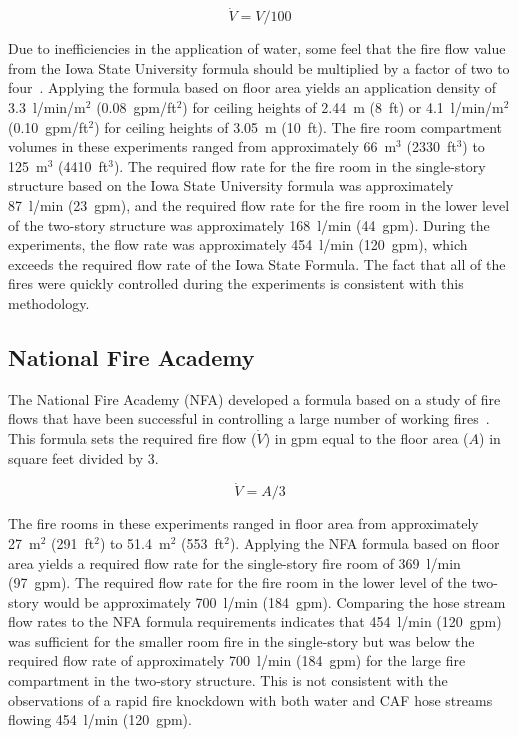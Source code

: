 \documentclass[12pt,oneside]{book}
\begin{document}
\begin{equation}\label{eq:isu_form}
\dot{V} = V / 100
\end{equation}

Due to inefficiencies in the application of water, some feel that the fire flow value from the Iowa State University formula should be multiplied by a factor of two to four~\cite{NFPA}. Applying the formula based on floor area yields an application density of 3.3~l/min/m$^2$ (0.08~gpm/ft$^2$) for ceiling heights of 2.44~m (8~ft) or 4.1~l/min/m$^2$ (0.10~gpm/ft$^2$) for ceiling heights of 3.05~m (10~ft). The fire room compartment volumes in these experiments ranged from approximately 66~m$^3$ (2330~ft$^3$) to 125~m$^3$ (4410~ft$^3$). The required flow rate for the fire room in the single-story structure based on the Iowa State University formula was approximately 87~l/min (23~gpm), and the required flow rate for the fire room in the lower level of the two-story structure was approximately 168~l/min (44~gpm). During the experiments, the flow rate was approximately 454~l/min (120~gpm), which exceeds the required flow rate of the Iowa State Formula. The fact that all of the fires were quickly controlled during the experiments is consistent with this methodology. 

\subsection{National Fire Academy}
The National Fire Academy (NFA) developed a formula based on a study of fire flows that have been successful in controlling a large number of working fires~\cite{Klaene:1}. This formula sets the required fire flow ($\dot{V}$) in gpm equal to the floor area ($A$) in square feet divided by 3.

\begin{equation}\label{eq:nfa_form}
\dot{V} = A / 3
\end{equation}

The fire rooms in these experiments ranged in floor area from approximately 27~m$^2$ (291~ft$^2$) to 51.4~m$^2$ (553~ft$^2$). Applying the NFA formula based on floor area yields a required flow rate for the single-story fire room of 369~l/min (97~gpm). The required flow rate for the fire room in the lower level of the two-story would be approximately 700~l/min (184~gpm). Comparing the hose stream flow rates to the NFA formula requirements indicates that 454~l/min (120~gpm) was sufficient for the smaller room fire in the single-story but was below the required flow rate of approximately 700~l/min (184~gpm) for the large fire compartment in the two-story structure. This is not consistent with the observations of a rapid fire knockdown with both water and CAF hose streams flowing 454~l/min (120~gpm). 
\end{document}
